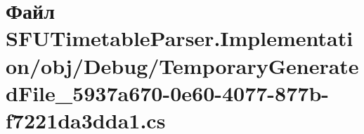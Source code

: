 \hypertarget{_s_f_u_timetable_parser_8_implementation_2obj_2_debug_2_temporary_generated_file__5937a670-0e60-4077-877b-f7221da3dda1_8cs}{}\section{Файл S\+F\+U\+Timetable\+Parser.\+Implementation/obj/\+Debug/\+Temporary\+Generated\+File\+\_\+5937a670-\/0e60-\/4077-\/877b-\/f7221da3dda1.cs}
\label{_s_f_u_timetable_parser_8_implementation_2obj_2_debug_2_temporary_generated_file__5937a670-0e60-4077-877b-f7221da3dda1_8cs}
